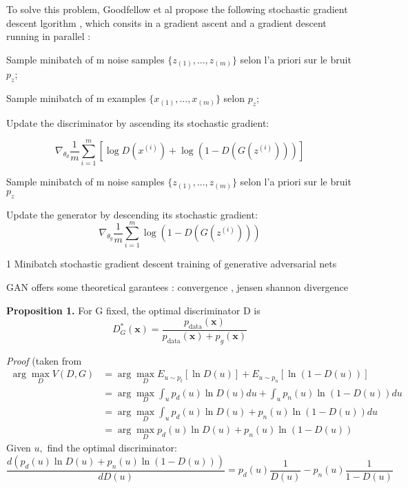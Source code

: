 \documentclass{article}
\begin{document}
To solve this problem, Goodfellow et al propose the following  stochastic gradient descent lgorithm , which consits in a gradient ascent and a gradient descent running in parallel : 


\begin{algorithm}[H]
\small
\begin{algorithmic}[1]

\item Sample minibatch of m noise samples   $\{z_{(1)} , . . . , z_{(m)}\}$ selon l'a priori sur le bruit $ p_{z}$;
\item Sample minibatch of m examples  $\{x_{(1)} , . . . , x_{(m)}\}$ selon $ p_{z}$;
\item Update the discriminator by ascending its stochastic gradient:

\begin{equation*}
\nabla_{\theta_{d}} \frac{1}{m} \sum_{i=1}^{m}\left[\log D\left(x^{(i)}\right)+\log \left(1-D\left(G\left(z^{(i)}\right)\right)\right)\right]
 \end{equation*}
\ENDFOR

\item Sample minibatch of m noise samples  $\{z_{(1)} , . . . , z_{(m)}\}$ selon l'a priori sur le bruit $ p_{z}$
\item Update the generator by descending its stochastic gradient:
\begin{equation*}
\nabla_{\theta_{g}} \frac{1}{m} \sum_{i=1}^{m} \log \left(1-D\left(G\left(z^{(i)}\right)\right)\right)
\end{equation*}
\ENDFOR
\end{algorithmic}
\caption{1 Minibatch stochastic gradient descent training of generative adversarial nets}
\label{alg:seq}
\end{algorithm}



GAN offers  some theoretical garantees : convergence , jensen shannon divergence

\textbf{Proposition 1.} For G fixed, the optimal discriminator D is
\begin{equation}D_{G}^{*}(\boldsymbol{x})=\frac{p_{\text {data}}(\boldsymbol{x})}{p_{\text {data}}(\boldsymbol{x})+p_{g}(\boldsymbol{x})}\end{equation}

\textit{Proof} (taken from \cite{einstein}
$$
\begin{aligned}
\arg \max _{D} V(D, G) &=\arg \max _{D} E_{u \sim p_{t}}[\ln D(u)]+E_{u \sim p_{n}}[\ln (1-D(u))] \\
&=\arg \max _{D} \int_{u} p_{d}(u) \ln D(u) d u+\int_{u} p_{n}(u) \ln (1-D(u)) d u \\
&=\arg \max _{D} \int_{u} p_{d}(u) \ln D(u)+p_{n}(u) \ln (1-D(u)) d u \\
&=\arg \max _{D} p_{d}(u) \ln D(u)+p_{n}(u) \ln (1-D(u))
\end{aligned}
$$
Given $u,$ find the optimal discriminator:
$$
\frac{d\left(p_{d}(u) \ln D(u)+p_{n}(u) \ln (1-D(u))\right)}{d D(u)}=p_{d}(u) \frac{1}{D(u)}-p_{n}(u) \frac{1}{1-D(u)}
$$
\end{document}
